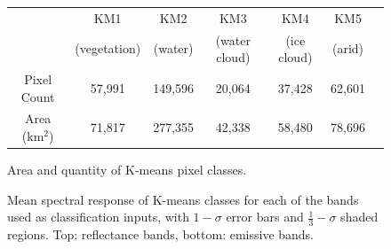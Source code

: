 \documentclass[12pt]{article}
\begin{document}
\begin{figure}[h!]
    \centering
    \begin{tabular}{c|cccccc}
        & KM1 & KM2 & KM3 & KM4 & KM5 \\
        & \footnotesize{(vegetation)} & \footnotesize{(water)} & \footnotesize{(water cloud)} & \footnotesize{(ice cloud)}& \footnotesize{(arid)} \\
        \hline
        Pixel Count & 57,991 & 149,596 & 20,064 & 37,428 & 62,601 \\
        Area (km$^2$) & 71,817 & 277,355 & 42,338 & 58,480 & 78,696 \\
    \end{tabular}
    \caption{Area and quantity of K-means pixel classes.}
    \label{km_areas}
\end{figure}

\clearpage

\begin{figure}[h!]
    \centering

    \begin{center}
    \end{center}

    \caption{Mean spectral response of K-means classes for each of the bands used as classification inputs, with $1-\sigma$ error bars and $\frac{1}{3}-\sigma$ shaded regions. Top: reflectance bands, bottom: emissive bands.}
    \label{km_results}
\end{figure}
\end{document}
